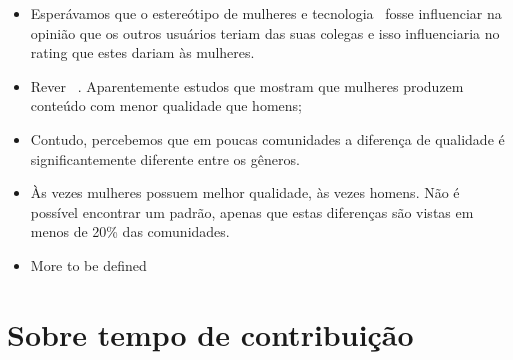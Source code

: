 \begin{itemize}
	\item Esperávamos que o estereótipo de mulheres e tecnologia~\cite{hyde1990gender} fosse influenciar na opinião que os outros usuários teriam das suas colegas e isso influenciaria no rating que estes dariam às mulheres.
	\item Rever ~\cite{campbell1986effects, collier2012conflict}. Aparentemente estudos que mostram que mulheres produzem conteúdo com menor qualidade que homens;
	\item Contudo, percebemos que em poucas comunidades a diferença de qualidade é significantemente diferente entre os gêneros.
	\item Às vezes mulheres possuem melhor qualidade, às vezes homens. Não é possível encontrar um padrão, apenas que estas diferenças são vistas em menos de 20\% das comunidades.
	\item More to be defined
\end{itemize}


\section{Sobre tempo de contribuição}


